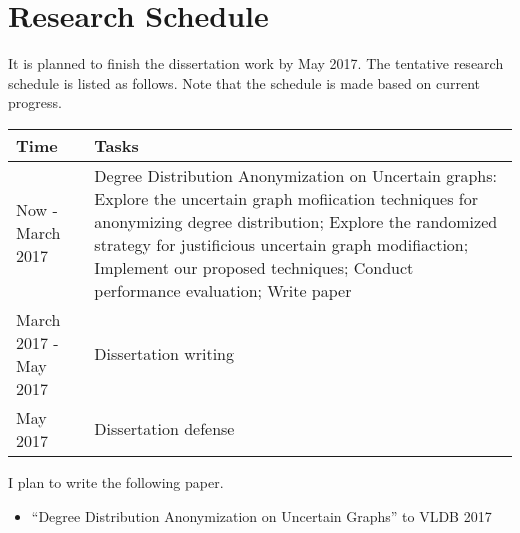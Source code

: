 \clearpage
\chapter{Research Schedule}
\label{chp:schedule}
It is planned to finish the dissertation work by May 2017. The tentative research schedule is listed as follows. Note that the schedule is made based on current progress. 

\bigskip

\begin{tabular}{|l|p{}|}
\hline Time & Tasks \\ \hline
Now - March 2017 &  Degree Distribution Anonymization on Uncertain graphs: Explore the uncertain graph mofiication techniques for anonymizing degree distribution; Explore the randomized strategy for justificious uncertain graph modifiaction; Implement our proposed techniques; Conduct performance evaluation; Write paper
\\ \hline
March 2017 - May 2017 &  Dissertation writing
\\ \hline
May 2017 & Dissertation defense\\ \hline
\end{tabular}

\bigskip

I plan to write the following paper.
\begin{itemize}
\item ``Degree Distribution Anonymization on Uncertain Graphs'' to VLDB 2017
\end{itemize}